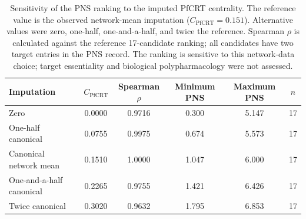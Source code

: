 \begin{table}[htbp]
\centering
\caption{Sensitivity of the PNS ranking to the imputed PfCRT centrality. The reference value is the observed network-mean imputation ($C_{\mathrm{PfCRT}}=\num{0.151}$). Alternative values were zero, one-half, one-and-a-half, and twice the reference. Spearman $\rho$ is calculated against the reference 17-candidate ranking; all candidates have two target entries in the PNS record. The ranking is sensitive to this network-data choice; target essentiality and biological polypharmacology were not assessed.}
\label{tab:s_pns_sensitivity}
\scriptsize
\begin{tabular}{l S[table-format=1.4] S[table-format=1.4] S[table-format=1.3] S[table-format=1.3] S[table-format=2.0]}
\toprule
Imputation & {$C_{\mathrm{PfCRT}}$} & {Spearman $\rho$} & {Minimum PNS} & {Maximum PNS} & {$n$} \\
\midrule
Zero & 0.0000 & 0.9716 & 0.300 & 5.147 & 17 \\
One-half canonical & 0.0755 & 0.9975 & 0.674 & 5.573 & 17 \\
Canonical network mean & 0.1510 & 1.0000 & 1.047 & 6.000 & 17 \\
One-and-a-half canonical & 0.2265 & 0.9755 & 1.421 & 6.426 & 17 \\
Twice canonical & 0.3020 & 0.9632 & 1.795 & 6.853 & 17 \\
\bottomrule
\end{tabular}
\end{table}
